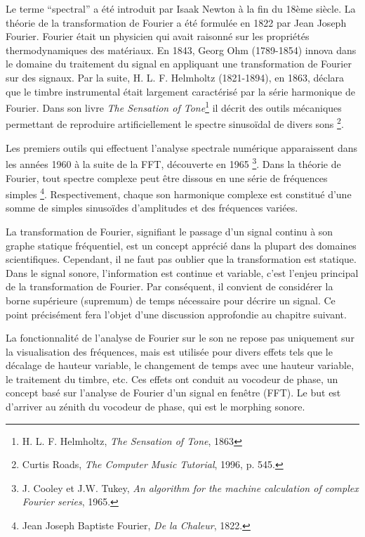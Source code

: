 Le terme “spectral” a été introduit par Isaak Newton à la fin du 18ème siècle. La théorie de la transformation de Fourier a été formulée en 1822 par Jean Joseph Fourier. Fourier était un physicien qui avait raisonné sur les propriétés thermodynamiques des matériaux. En 1843, Georg Ohm (1789-1854) innova dans le domaine du traitement du signal en appliquant une transformation de Fourier sur des signaux. Par la suite, H. L. F. Helmholtz (1821-1894), en 1863, déclara que le timbre instrumental était largement caractérisé par la série harmonique de Fourier. Dans son livre \textit{The Sensation of Tone}\footnote{H. L. F. Helmholtz, \textit{The Sensation of Tone}, 1863} il décrit des outils mécaniques permettant de reproduire artificiellement le spectre sinusoïdal de divers sons \footnote{ Curtis Roads, \textit{The Computer Music Tutorial}, 1996, p. 545. \nocite{Routes: 1996: CMT: 525484}}.

Les premiers outils qui effectuent l'analyse spectrale numérique apparaissent dans les années 1960 à la suite de la FFT, découverte en 1965 \footnote{J. Cooley et J.W. Tukey, \textit{An algorithm for the machine calculation of complex Fourier series}, 1965. \nocite{Fourier_complex}}. Dans la théorie de Fourier, tout spectre complexe peut être dissous en une série de fréquences simples \footnote{Jean Joseph Baptiste Fourier, \textit{De la Chaleur}, 1822. \nocite{Herm1895}}. Respectivement, chaque son harmonique complexe est constitué d'une somme de simples sinusoïdes d'amplitudes et des fréquences variées.

La transformation de Fourier, signifiant le passage d'un signal continu à son graphe statique fréquentiel, est un concept apprécié dans la plupart des domaines scientifiques. Cependant, il ne faut pas oublier que la transformation est statique. Dans le signal sonore, l'information est continue et variable, c'est l'enjeu principal de la transformation de Fourier. Par conséquent, il convient de considérer la borne supérieure (supremum) de temps nécessaire pour décrire un signal. Ce point précisément fera l’objet d’une discussion approfondie au chapitre suivant.

La fonctionnalité de l'analyse de Fourier sur le son ne repose pas uniquement sur la visualisation des fréquences, mais est utilisée pour divers effets tels que le décalage de hauteur variable, le changement de temps avec une hauteur variable, le traitement du timbre, etc. Ces effets ont conduit au vocodeur de phase, un concept basé sur l'analyse de Fourier d'un signal en fenêtre (FFT). Le but est d’arriver au zénith du vocodeur de phase, qui est le morphing sonore.
		
